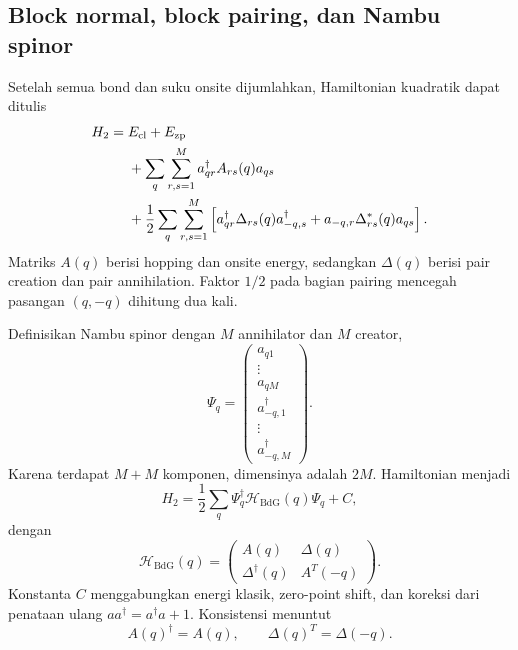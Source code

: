\documentclass[11pt,a4paper]{article}
\newcommand{\mH}{\mathcal H}
\begin{document}
\subsection{Block normal, block pairing, dan Nambu spinor}

Setelah semua bond dan suku onsite dijumlahkan, Hamiltonian kuadratik dapat ditulis
\begin{align}
H_2={}&E_{\mathrm{cl}}+E_{\mathrm{zp}}\notag\\
&+\sum_q\sum_{r,s=1}^M a_{qr}^\dagger A_{rs}(q)a_{qs}\notag\\
&+\frac12\sum_q\sum_{r,s=1}^M
\left[a_{qr}^\dagger\Delta_{rs}(q)a_{-q,s}^\dagger
+a_{-q,r}\Delta_{rs}^*(q)a_{qs}\right].
\label{eq:quadratic-block-form}
\end{align}
Matriks $A(q)$ berisi hopping dan onsite energy, sedangkan $\Delta(q)$ berisi pair creation dan pair annihilation. Faktor $1/2$ pada bagian pairing mencegah pasangan $(q,-q)$ dihitung dua kali.

Definisikan Nambu spinor dengan $M$ annihilator dan $M$ creator,
\begin{equation}
\Psi_q=
\begin{pmatrix}
a_{q1}\\ \vdots\\a_{qM}\\
a_{-q,1}^\dagger\\ \vdots\\a_{-q,M}^\dagger
\end{pmatrix}.
\label{eq:nambu-spinor}
\end{equation}
Karena terdapat $M+M$ komponen, dimensinya adalah $2M$. Hamiltonian menjadi
\begin{equation}
H_2=\frac12\sum_q\Psi_q^\dagger
\mH_{\mathrm{BdG}}(q)\Psi_q+C,
\label{eq:bdg-hamiltonian}
\end{equation}
dengan
\begin{equation}
\boxed{
\mH_{\mathrm{BdG}}(q)=
\begin{pmatrix}
A(q)&\Delta(q)\\
\Delta^\dagger(q)&A^T(-q)
\end{pmatrix}.}
\label{eq:bdg-matrix}
\end{equation}
Konstanta $C$ menggabungkan energi klasik, zero-point shift, dan koreksi dari penataan ulang $aa^\dagger=a^\dagger a+1$. Konsistensi menuntut
\begin{equation}
A(q)^\dagger=A(q),
\qquad
\Delta(q)^T=\Delta(-q).
\label{eq:bdg-consistency}
\end{equation}
\end{document}
